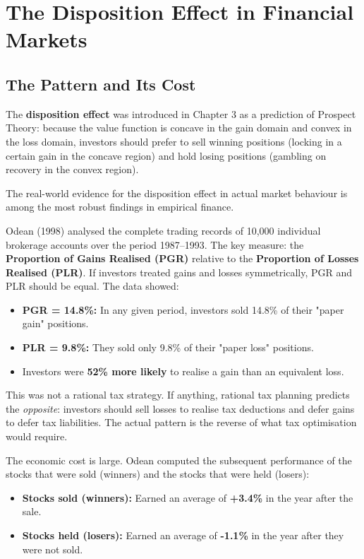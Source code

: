 \documentclass[12pt, letterpaper]{article}
\begin{document}
\medskip


\section{The Disposition Effect in Financial Markets}



\subsection{The Pattern and Its Cost}


The \textbf{disposition effect} was introduced in Chapter 3 as a prediction of Prospect Theory: because the value function is concave in the gain domain and convex in the loss domain, investors should prefer to sell winning positions (locking in a certain gain in the concave region) and hold losing positions (gambling on recovery in the convex region).

The real-world evidence for the disposition effect in actual market behaviour is among the most robust findings in empirical finance.

Odean (1998) analysed the complete trading records of 10,000 individual brokerage accounts over the period 1987--1993. The key measure: the \textbf{Proportion of Gains Realised (PGR)} relative to the \textbf{Proportion of Losses Realised (PLR)}. If investors treated gains and losses symmetrically, PGR and PLR should be equal. The data showed:

\begin{itemize}
\item \textbf{PGR = 14.8\%:} In any given period, investors sold 14.8\% of their "paper gain" positions.
\item \textbf{PLR = 9.8\%:} They sold only 9.8\% of their "paper loss" positions.
\item Investors were \textbf{52\% more likely} to realise a gain than an equivalent loss.
\end{itemize}

This was not a rational tax strategy. If anything, rational tax planning predicts the \textit{opposite}: investors should sell losses to realise tax deductions and defer gains to defer tax liabilities. The actual pattern is the reverse of what tax optimisation would require.

The economic cost is large. Odean computed the subsequent performance of the stocks that were sold (winners) and the stocks that were held (losers):
\begin{itemize}
\item \textbf{Stocks sold (winners):} Earned an average of \textbf{+3.4\%} in the year after the sale.
\item \textbf{Stocks held (losers):} Earned an average of \textbf{-1.1\%} in the year after they were not sold.
\end{itemize}
\end{document}

